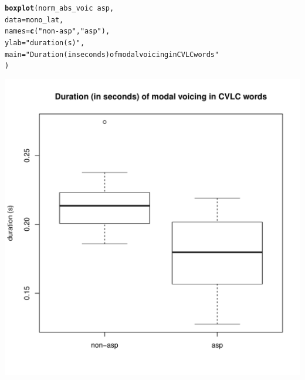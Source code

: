 \documentclass[a4paper,11pt]{article}\usepackage[]{graphicx}\usepackage[]{color}
\makeatletter
\def\maxwidth{ %
  \ifdim\Gin@nat@width>\linewidth
    \linewidth
  \else
    \Gin@nat@width
  \fi
}
\newcommand{\hlstr}[1]{\textcolor[rgb]{0.192,0.494,0.8}{#1}}%
\newcommand{\hlopt}[1]{\textcolor[rgb]{0,0,0}{#1}}%
\newcommand{\hlstd}[1]{\textcolor[rgb]{0.345,0.345,0.345}{#1}}%
\newcommand{\hlkwc}[1]{\textcolor[rgb]{0.333,0.667,0.333}{#1}}%
\newcommand{\hlkwd}[1]{\textcolor[rgb]{0.737,0.353,0.396}{\textbf{#1}}}%
\newenvironment{kframe}{%
 \def\at@end@of@kframe{}%
 \ifinner\ifhmode%
  \def\at@end@of@kframe{\end{minipage}}%
  \begin{minipage}{\columnwidth}%
 \fi\fi%
 \def\FrameCommand##1{\hskip\@totalleftmargin \hskip-\fboxsep
 \colorbox{shadecolor}{##1}\hskip-\fboxsep
     \hskip-\linewidth \hskip-\@totalleftmargin \hskip\columnwidth}%
 \MakeFramed {\advance\hsize-\width
   \@totalleftmargin\z@ \linewidth\hsize
   \@setminipage}}%
 {\par\unskip\endMakeFramed%
 \at@end@of@kframe}
\newenvironment{knitrout}{}{} %
\makeatother
\begin{document}
\begin{knitrout}
\color{fgcolor}\begin{kframe}
\begin{alltt}
\hlkwd{boxplot}\hlstd{(norm_abs_voic} \hlopt{~} \hlstd{asp,}
        \hlkwc{data} \hlstd{= mono_lat,}
        \hlkwc{names} \hlstd{=} \hlkwd{c}\hlstd{(}\hlstr{"non-asp"}\hlstd{,} \hlstr{"asp"}\hlstd{),}
        \hlkwc{ylab} \hlstd{=} \hlstr{"duration (s)"}\hlstd{,}
        \hlkwc{main} \hlstd{=} \hlstr{"Duration (in seconds) of modal voicing in CVLC words"}
        \hlstd{)}
\end{alltt}
\end{kframe}

{\centering \includegraphics[width=\maxwidth]{img/mono-lat-box-1} 

}



\end{knitrout}
\end{document}
